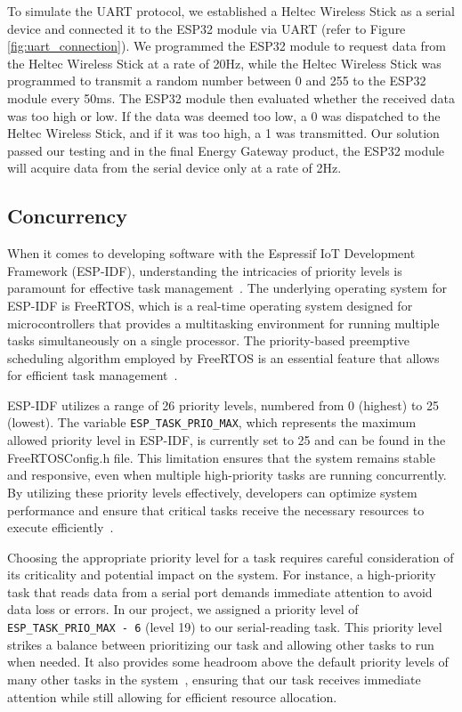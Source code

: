 To simulate the UART protocol, we established a Heltec Wireless Stick as a serial device and connected it to the ESP32 module via UART (refer to Figure \ref{fig:uart_connection}). We programmed the ESP32 module to request data from the Heltec Wireless Stick at a rate of 20Hz, while the Heltec Wireless Stick was programmed to transmit a random number between 0 and 255 to the ESP32 module every 50ms. The ESP32 module then evaluated whether the received data was too high or low. If the data was deemed too low, a 0 was dispatched to the Heltec Wireless Stick, and if it was too high, a 1 was transmitted. Our solution passed our testing and in the final Energy Gateway product, the ESP32 module will acquire data from the serial device only at a rate of 2Hz.

\subsection{Concurrency}

When it comes to developing software with the Espressif IoT Development Framework (ESP-IDF), understanding the intricacies of priority levels is paramount for effective task management~\cite{Davis:2016}. The underlying operating system for ESP-IDF is FreeRTOS, which is a real-time operating system designed for microcontrollers that provides a multitasking environment for running multiple tasks simultaneously on a single processor. The priority-based preemptive scheduling algorithm employed by FreeRTOS is an essential feature that allows for efficient task management~\cite{espressif:esp-idf-programming-guide}.

ESP-IDF utilizes a range of 26 priority levels, numbered from 0 (highest) to 25 (lowest). The variable \texttt{ESP\_TASK\_PRIO\_MAX}, which represents the maximum allowed priority level in ESP-IDF, is currently set to 25 and can be found in the FreeRTOSConfig.h file\cite{espressif:freertosconfig}. This limitation ensures that the system remains stable and responsive, even when multiple high-priority tasks are running concurrently. By utilizing these priority levels effectively, developers can optimize system performance and ensure that critical tasks receive the necessary resources to execute efficiently~\cite{espressif:esp-idf-programming-guide}.

Choosing the appropriate priority level for a task requires careful consideration of its criticality and potential impact on the system. For instance, a high-priority task that reads data from a serial port demands immediate attention to avoid data loss or errors. In our project, we assigned a priority level of \texttt{ESP\_TASK\_PRIO\_MAX - 6} (level 19) to our serial-reading task. This priority level strikes a balance between prioritizing our task and allowing other tasks to run when needed. It also provides some headroom above the default priority levels of many other tasks in the system~\cite{espressif:esp-idf-programming-guide}, ensuring that our task receives immediate attention while still allowing for efficient resource allocation.

